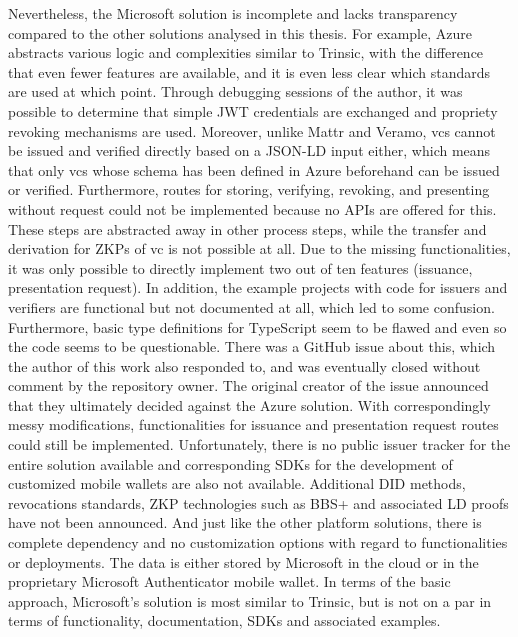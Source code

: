         Nevertheless, the Microsoft solution is incomplete and lacks transparency compared to the other solutions analysed in this thesis. For example, Azure abstracts various logic and complexities similar to Trinsic, with the difference that even fewer features are available, and it is even less clear which standards are used at which point. Through debugging sessions of the author, it was possible to determine that simple JWT credentials are exchanged and propriety revoking mechanisms are used. Moreover, unlike Mattr and Veramo, \acp{vc} cannot be issued and verified directly based on a JSON-LD input either, which means that only \acp{vc} whose schema has been defined in Azure beforehand can be issued or verified. Furthermore, routes for storing, verifying, revoking, and presenting without request could not be implemented because no APIs are offered for this. These steps are abstracted away in other process steps, while the transfer and derivation for \acp{ZKP} of \ac{vc} is not possible at all. Due to the missing functionalities, it was only possible to directly implement two out of ten features (issuance, presentation request). In addition, the example projects with code for issuers and verifiers are functional but not documented at all, which led to some confusion. Furthermore, basic type definitions for TypeScript seem to be flawed and even so the code seems to be questionable. There was a GitHub issue \cite{yegupov_demo_2021} about this, which the author of this work also responded to, and was eventually closed without comment by the repository owner. The original creator of the issue announced that they ultimately decided against the Azure solution. With correspondingly messy modifications, functionalities for issuance and presentation request routes could still be implemented. Unfortunately, there is no public issuer tracker for the entire solution available and corresponding SDKs for the development of customized mobile wallets are also not available. Additional \ac{DID} methods, revocations standards, \ac{ZKP} technologies such as BBS+ and associated LD proofs have not been announced. And just like the other platform solutions, there is complete dependency and no customization options with regard to functionalities or deployments. The data is either stored by Microsoft in the cloud or in the proprietary Microsoft Authenticator mobile wallet. In terms of the basic approach, Microsoft's solution is most similar to Trinsic, but is not on a par in terms of functionality, documentation, SDKs and associated examples.

